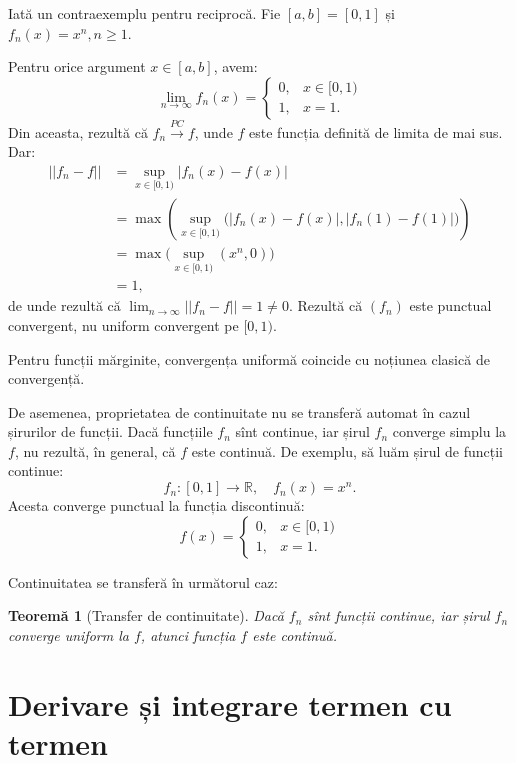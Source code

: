 \documentclass[11pt,a4paper]{article}
\newcommand\ds{\displaystyle}
\newcommand\xrar{\xrightarrow}
\newcommand\RR{\mathbb{R}}
\theoremstyle{dotless}
\newtheorem{theorem}{Teorem\u{a}}[section]
\theoremstyle{dotlessdr}
\begin{document}
Iată un contraexemplu pentru reciprocă. Fie $[a, b] = [0, 1]$ și $f_n(x) = x^n, n \geq 1$.

Pentru orice argument $x \in [a, b]$, avem:
\[
  \lim_{n \to \infty} f_n(x) =
  \begin{cases}
    0, & x \in [0, 1) \\
    1, & x = 1.
  \end{cases}
\]
Din aceasta, rezultă că $f_n \xrar{PC} f$, unde $f$ este funcția definită de limita de mai sus.
Dar:
\begin{align*}
  ||f_n - f|| &= \sup_{x \in [0, 1)} |f_n(x) - f(x)| \\
              &= \max( \sup_{x \in [0, 1)} \big( |f_n(x) - f(x)|, |f_n(1) - f(1)|\big)) \\
              &= \max \big( \sup_{x \in [0, 1)} (x^n, 0) \big) \\
              &= 1,
\end{align*}
de unde rezultă că $\ds\lim_{n \to \infty} ||f_n - f|| = 1 \neq 0$. Rezultă că $(f_n)$ este punctual
convergent, nu uniform convergent pe $[0, 1)$.

Pentru funcții mărginite, convergența uniformă coincide cu noțiunea clasică de convergență.

De asemenea, proprietatea de continuitate nu se transferă automat în cazul șirurilor de funcții.
Dacă funcțiile $f_n$ sînt continue, iar șirul $f_n$ converge simplu la $f$, nu rezultă, în general,
că $f$ este continuă. De exemplu, să luăm șirul de funcții continue:
\[
  f_n : [0, 1] \to \RR, \quad f_n(x) = x^n.
\]
Acesta converge punctual la funcția discontinuă:
\[
  f(x) = \begin{cases}
    0, & x \in [0, 1) \\
    1, & x = 1.
  \end{cases}
\]

Continuitatea se transferă în următorul caz:

\begin{theorem}[Transfer de continuitate]\label{thm:transfer-cont}
  Dacă $f_n$ sînt funcții continue, iar șirul $f_n$ converge uniform la $f$,
  atunci funcția $f$  este continuă.
\end{theorem}


\section{Derivare și integrare termen cu termen}
\label{sec:der-int-termen}
\end{document}

